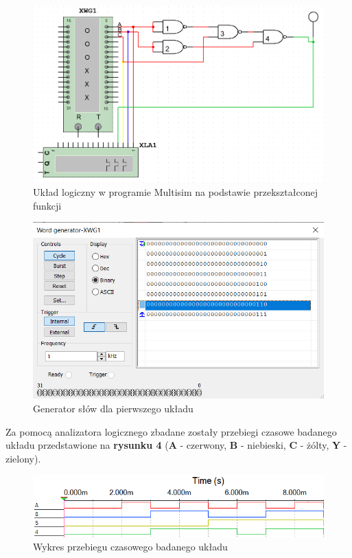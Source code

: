 \documentclass{article}
\begin{document}
\begin{figure}[H]
    \centering
    \includegraphics[width=\textwidth]{uklad_1.png}
    \caption{Układ logiczny w programie Multisim na podstawie przekształconej funkcji}
\end{figure}

\begin{figure}[H]
    \centering
    \includegraphics[width=\textwidth]{generator_1.png}
    \caption{Generator słów dla pierwszego układu}
\end{figure}

Za pomocą analizatora logicznego zbadane zostały przebiegi czasowe badanego układu przedstawione na 
\textbf{rysunku 4} (\textbf{A} - czerwony, \textbf{B} - niebieski, \textbf{C} - żólty, \textbf{Y} - zielony).

\begin{figure}[H]
    \centering
    \includegraphics[width=\textwidth]{analiza_1.png}
    \caption{Wykres przebiegu czasowego badanego układu}
\end{figure}
\end{document}
